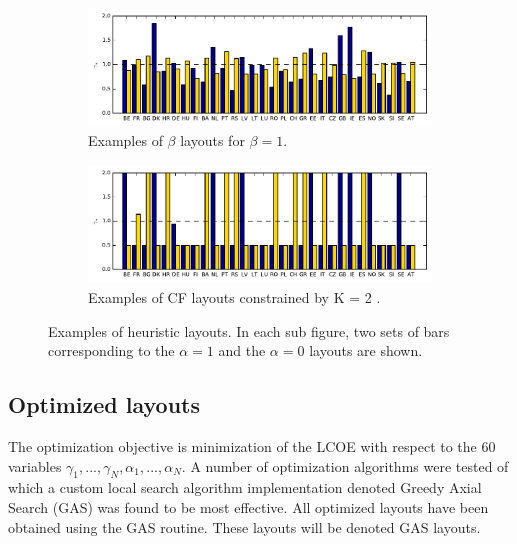 \documentclass[a4paper, 5p, sort&compress]{elsarticle}%
\newcommand{\chromowidth}{1.00 \columnwidth}
\begin{document}
\begin{figure}[h!]
  \centering
  \begin{subfigure}{2\columnwidth}
    \includegraphics[width = \chromowidth, center]{beta=1}
    \caption{Examples of $\beta$ layouts for $\beta = 1$.}
    \label{fig:betaExamples}    
  \end{subfigure}
  \begin{subfigure}{2\columnwidth}
    \includegraphics[width = \chromowidth, center]{k=2cfMax}
    \caption{Examples of CF layouts constrained by K = 2 .}
    \label{fig:cfMaxExamples}    
  \end{subfigure}
  \caption{Examples of heuristic layouts. In each sub figure, two sets
    of bars corresponding to the $\alpha = 1$ and the $\alpha = 0$ layouts are
    shown.}
  \label{fig:examples}
\end{figure}

\subsection{Optimized layouts}
\label{sec:optimized-layouts}

The optimization objective is minimization of the LCOE with respect to
the 60 variables
$\gamma_{1}, ..., \gamma_{N}, \alpha_{1}, ..., \alpha_{N}$.  A number of optimization
algorithms were tested of which a custom local search algorithm
implementation denoted Greedy Axial Search
(GAS) %
was found to be most effective. All optimized layouts have been
obtained using the GAS routine. These layouts will be denoted GAS
layouts.
\end{document}
